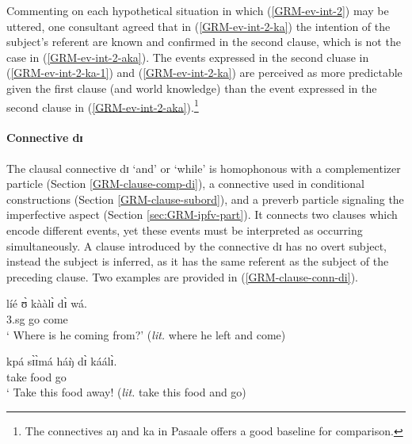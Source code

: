 \z 
 \z

Commenting on each hypothetical situation in which (\ref{GRM-ev-int-2}) may be 
uttered, one consultant agreed 
that in (\ref{GRM-ev-int-2-ka}) the intention of the subject's referent are 
known and confirmed in the second clause, which is not the case in   
(\ref{GRM-ev-int-2-aka}). The  events expressed in the second cluase in  
(\ref{GRM-ev-int-2-ka-1}) and  (\ref{GRM-ev-int-2-ka}) are perceived as more 
predictable given the first clause (and world knowledge) than the event 
expressed in the second clause  in (\ref{GRM-ev-int-2-aka}).\footnote{The 
connectives {\sls aŋ}  and {\sls ka} in Pasaale \citep{mcgi99} offers a good 
baseline for comparison.}  




\paragraph{Connective dɪ}
\label{GRM-clause-coord-di}
The clausal connective {\sls dɪ} `and' or `while'  is homophonous with a
complementizer particle (Section \ref{GRM-clause-comp-di}), a connective used in
conditional constructions (Section \ref{GRM-clause-subord}),   and a preverb
particle signaling the imperfective aspect (Section \ref{sec:GRM-ipfv-part}). It
connects two clauses which encode different events, yet these events must be
interpreted as occurring simultaneously.  A clause introduced by the connective
{\sls dɪ} has no overt subject, instead the subject is inferred, as it has the
same referent as the subject of the preceding clause. Two examples are
provided in (\ref{GRM-clause-conn-di}). 


\ea\label{GRM-clause-conn-di}

\ea\label{GRM-clause-conn-di-vp22.4.9.}
\gll líé ʊ̀ kààlɪ̀ dɪ̀ wá.\\
  {\q} {\sc 3.sg} go {\conn} come\\
\glt  ` Where is he coming from?' ({\it lit.} where he left and  come)

\ex\label{GRM-clause-conn-di-vp47.2.9.}
\gll kpá sɪ̀ɪ̀má háŋ̀ dɪ̀ káálɪ̀.\\
 take   food {\dem}  {\conn} go\\
\glt  ` Take this food away! ({\it lit.} take this food and go)


